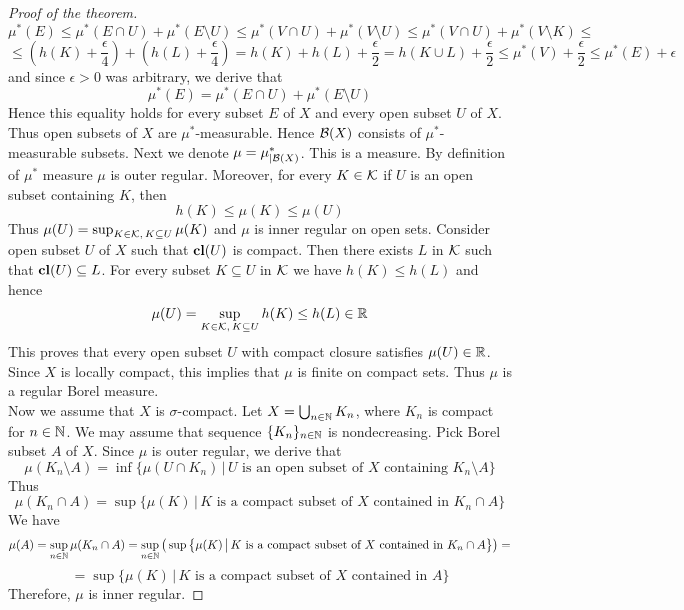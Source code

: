 \begin{proof}[Proof of the theorem]
$$\mu^*(E) \leq \mu^*(E\cap U) + \mu^*(E\setminus U) \leq \mu^*(V\cap U) + \mu^*(V\setminus U) \leq \mu^*(V\cap U) + \mu^*(V\setminus K)\leq $$
$$\leq \left(h(K)+\frac{\epsilon}{4}\right) + \left(h(L) + \frac{\epsilon}{4}\right)= h(K) + h(L) + \frac{\epsilon}{2} = h(K\cup L) + \frac{\epsilon}{2}\leq \mu^*(V) +\frac{\epsilon}{2} \leq \mu^*(E) + \epsilon$$
and since $\epsilon > 0$ was arbitrary, we derive that
$$\mu^*(E) = \mu^*(E\cap U) + \mu^*(E\setminus U)$$
Hence this equality holds for every subset $E$ of $X$ and every open subset $U$ of $X$. Thus open subsets of $X$ are $\mu^*$-measurable. Hence ${\mathcal B}(X)$ consists of $\mu^*$-measurable subsets. Next we denote $\mu = \mu^*_{\mid {\mathcal B}(X)}$. This is a measure. By definition of $\mu^*$ measure $\mu$ is outer regular. Moreover, for every $K\in {\mathcal K}$ if $U$ is an open subset containing $K$, then
$$h(K)\leq \mu(K)\leq \mu(U)$$
Thus $\mu(U) = \sup_{K\in {\mathcal K},\,K\subseteq U}\mu(K)$ and $\mu$ is inner regular on open sets. Consider open subset $U$ of $X$ such that $\mathbf{cl}(U)$ is compact. Then there exists $L$ in ${\mathcal K}$ such that $\mathbf{cl}(U)\subseteq L$. For every subset $K\subseteq U$ in ${\mathcal K}$ we have $h(K) \leq h(L)$ and hence
$$\mu(U) = \sup_{K\in {\mathcal K},\,K\subseteq U}h(K) \leq h(L)\in {\mathbb R}$$
This proves that every open subset $U$ with compact closure satisfies $\mu(U)\in {\mathbb R}$. Since $X$ is locally compact, this implies that $\mu$ is finite on compact sets. Thus $\mu$ is a regular Borel measure.\\
Now we assume that $X$ is $\sigma$-compact. Let $X = \bigcup_{n\in {\mathbb N}}K_n$, where $K_n$ is compact for $n\in {\mathbb N}$. We may assume that sequence $\{K_n\}_{n\in {\mathbb N}}$ is nondecreasing. Pick Borel subset $A$ of $X$. Since $\mu$ is outer regular, we derive that
$$\mu(K_n\setminus A) = \inf \big\{\mu\left(U\cap K_n\right)\,\big|\,U\mbox{ is an open subset of }X\mbox{ containing }K_n\setminus A\big\}$$
Thus
$$\mu(K_n\cap A) = \sup  \big\{\mu(K)\,\big|\,K\mbox{ is a compact subset of }X\mbox{ contained in }K_n\cap  A\big\}$$
We have
$$\mu(A) = \sup_{n\in {\mathbb N}}\mu(K_n\cap A) = \sup_{n\in {\mathbb N}}\big(\sup \big\{\mu(K)\,\big|\,K\mbox{ is a compact subset of }X\mbox{ contained in }K_n\cap  A\big\}\big) = $$
$$=\sup  \big\{\mu(K)\,\big|\,K\mbox{ is a compact subset of }X\mbox{ contained in }A\big\}$$
Therefore, $\mu$ is inner regular.
\end{proof}

